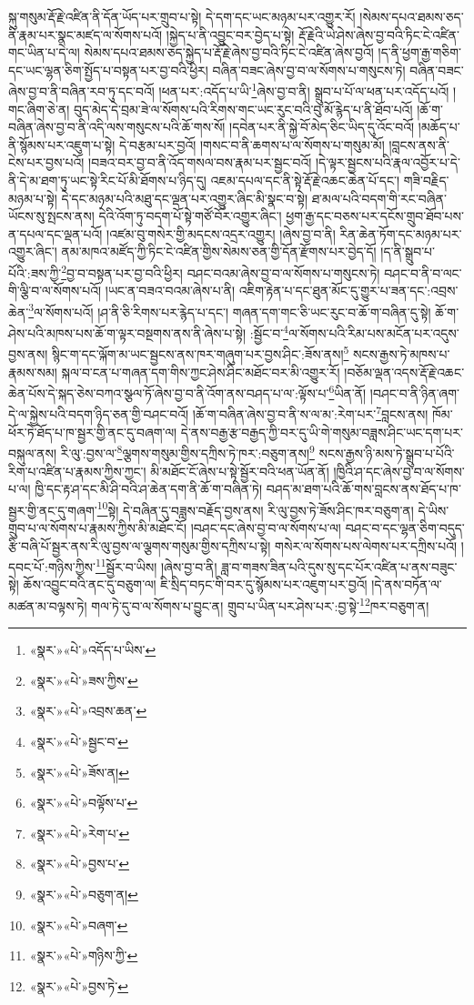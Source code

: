 སྐུ་གསུམ་རྡོ་རྗེ་འཛིན་ནི་དོན་ཡོད་པར་གྲུབ་པ་སྟེ། དེ་དག་དང་ཡང་མཉམ་པར་འགྱུར་རོ། །སེམས་དཔའ་ཐམས་ཅད་ནི་རྣམ་པར་སྣང་མཛད་ལ་སོགས་པའོ། །སྐྱེད་པ་ནི་འབྱུང་བར་བྱེད་པ་སྟེ། རྡོ་རྗེའི་ཡེ་ཤེས་ཞེས་བྱ་བའི་ཏིང་ངེ་འཛིན་གང་ཡིན་པ་དེ་ལ། སེམས་དཔའ་ཐམས་ཅད་སྐྱེད་པ་རྡོ་རྗེ་ཞེས་བྱ་བའི་ཏིང་ངེ་འཛིན་ཞེས་བྱའོ། །ད་ནི་ཕྱག་རྒྱ་གཅིག་དང་ཡང་ལྷན་ཅིག་སྤྱོད་པ་བསྟན་པར་བྱ་བའི་ཕྱིར། བཞིན་བཟང་ཞེས་བྱ་བ་ལ་སོགས་པ་གསུངས་ཏེ། བཞིན་བཟང་ཞེས་བྱ་བ་ནི་བཞིན་རབ་ཏུ་དང་བའོ། །ཕན་པར་:འདོད་པ་ཡི་\footnote{«སྣར་»«པེ་»འདོད་པ་ཡིས་}ཞེས་བྱ་བ་ནི། སྒྲུབ་པ་པོ་ལ་ཕན་པར་འདོད་པའོ། །གང་ཞིག་ཅེ་ན། བུད་མེད་དེ་བྲམ་ཟེ་ལ་སོགས་པའི་རིགས་གང་ཡང་རུང་བའི་བུ་མོ་རྙེད་པ་ནི་ཐོབ་པའོ། །ཆོ་ག་བཞིན་ཞེས་བྱ་བ་ནི་འདི་ལས་གསུངས་པའི་ཆོ་གས་སོ། །དབེན་པར་ནི་སྐྱེ་བོ་མེད་ཅིང་ཡིད་དུ་འོང་བའོ། །མཆོད་པ་ནི་སྙོམས་པར་འཇུག་པ་སྟེ། དེ་བརྩམ་པར་བྱའོ། །གསང་བ་ནི་ཆགས་པ་ལ་སོགས་པ་གསུམ་མོ། །བླངས་ནས་ནི་ངེས་པར་བྱས་པའོ། །བཟའ་བར་བྱ་བ་ནི་འོད་གསལ་བས་རྣམ་པར་སྦྱང་བའོ། །དེ་ལྟར་སྦྱངས་པའི་རྣལ་འབྱོར་པ་དེ་ནི་དེ་མ་ཐག་ཏུ་ཡང་སྟེ་རིང་པོ་མི་ཐོགས་པ་ཉིད་དུ། འཇམ་དཔལ་དང་ནི་སྟེ་རྡོ་རྗེ་འཆང་ཆེན་པོ་དང་། གཟི་བརྗིད་མཉམ་པ་སྟེ། དེ་དང་མཉམ་པའི་མཐུ་དང་ལྡན་པར་འགྱུར་ཞིང་མི་སྣང་བ་སྟེ། ཐ་མལ་པའི་བདག་གི་རང་བཞིན་ཡོངས་སུ་སྤངས་ནས། དེའི་འོག་ཏུ་བདག་པོ་སྟེ་གཙོ་བོར་འགྱུར་ཞིང་། ཕྱག་རྒྱ་དང་བཅས་པར་དངོས་གྲུབ་ཐོབ་པས་ན་དཔལ་དང་ལྡན་པའོ། །འཛམ་བུ་གསེར་གྱི་མདངས་འདྲར་འགྱུར། །ཞེས་བྱ་བ་ནི། རིན་ཆེན་ཏོག་དང་མཉམ་པར་འགྱུར་ཞིང་། ནམ་མཁའ་མཛོད་ཀྱི་ཏིང་ངེ་འཛིན་གྱིས་སེམས་ཅན་གྱི་དོན་རྫོགས་པར་བྱེད་དོ། །ད་ནི་སྒྲུབ་པ་པོའི་:ཟས་ཀྱི་\footnote{«སྣར་»«པེ་»ཟས་ཀྱིས་}བྱ་བ་བསྟན་པར་བྱ་བའི་ཕྱིར། བཤང་བའམ་ཞེས་བྱ་བ་ལ་སོགས་པ་གསུངས་ཏེ། བཤང་བ་ནི་བ་ལང་གི་ལྕི་བ་ལ་སོགས་པའོ། །ཡང་ན་བཟའ་བའམ་ཞེས་པ་ནི། འཇིག་རྟེན་པ་དང་ཐུན་མོང་དུ་གྱུར་པ་ཟན་དང་:འབྲས་ཆེན་\footnote{«སྣར་»«པེ་»འབྲས་ཆན་}ལ་སོགས་པའོ། །ཤ་ནི་ཅི་རིགས་པར་རྙེད་པ་དང་། གཞན་དག་གང་ཅི་ཡང་རུང་བ་ཆོ་ག་བཞིན་དུ་སྟེ། ཆོ་ག་ཤེས་པའི་མཁས་པས་ཆོ་ག་ལྟར་བསྔགས་ནས་ནི་ཞེས་པ་སྟེ། :སྦྱོང་བ་\footnote{«སྣར་»«པེ་»སྦྱང་བ་}ལ་སོགས་པའི་རིམ་པས་མངོན་པར་འདུས་བྱས་ནས། སྙིང་ག་དང་ལྐོག་མ་ཡང་སྦྱངས་ནས་ཁར་གཞུག་པར་བྱས་ཤིང་:ཟོས་ནས།\footnote{«སྣར་»«པེ་»ཟོས་ན།} སངས་རྒྱས་ཏེ་མཁས་པ་རྣམས་སམ། སྐལ་བ་ངན་པ་གཞན་དག་གིས་ཀྱང་ཤེས་ཤིང་མཐོང་བར་མི་འགྱུར་རོ། །བཅོམ་ལྡན་འདས་རྡོ་རྗེ་འཆང་ཆེན་པོས་དེ་སྐད་ཅེས་བཀའ་སྩལ་ཏོ་ཞེས་བྱ་བ་ནི་འོག་ནས་བཤད་པ་ལ་:ལྟོས་པ་\footnote{«སྣར་»«པེ་»བལྟོས་པ་}ཡིན་ནོ། །བཤང་བ་ནི་ཉིན་ཞག་དེ་ལ་སྐྱེས་པའི་བདག་ཉིད་ཅན་གྱི་བཤང་བའོ། །ཆོ་ག་བཞིན་ཞེས་བྱ་བ་ནི་ས་ལ་མ་:རེག་པར་\footnote{«སྣར་»«པེ་»རེག་པ་}བླངས་ནས། ཁོམ་ཕོར་ཏེ་ཐོད་པ་ཁ་སྦྱར་གྱི་ནང་དུ་བཞག་ལ། དེ་ནས་བརྒྱ་རྩ་བརྒྱད་ཀྱི་བར་དུ་ཡི་གེ་གསུམ་བཟླས་ཤིང་ཡང་དག་པར་བསྐུལ་ནས། རི་ལུ་:བྱས་ལ་\footnote{«སྣར་»«པེ་»བྱས་པ་}ལྕགས་གསུམ་གྱིས་དཀྲིས་ཏེ་ཁར་:བཅུག་ནས།\footnote{«སྣར་»«པེ་»བཅུག་ན།} སངས་རྒྱས་ཉི་མས་ཏེ་སྒྲུབ་པ་པོའི་རིག་པ་འཛིན་པ་རྣམས་ཀྱིས་ཀྱང་། མི་མཐོང་ངོ་ཞེས་པ་སྟེ་སྦྱོར་བའི་ཕན་ཡོན་ནོ། །ཁྱིའི་ཤ་དང་ཞེས་བྱ་བ་ལ་སོགས་པ་ལ། ཁྱི་དང་རྟ་ཤ་དང་མི་ཤི་བའི་ཤ་ཆེན་དག་ནི་ཆོ་ག་བཞིན་ཏེ། བཤད་མ་ཐག་པའི་ཆོ་གས་བླངས་ནས་ཐོད་པ་ཁ་སྦྱར་གྱི་ནང་དུ་གཞག་\footnote{«སྣར་»«པེ་»བཞག་}སྟེ། དེ་བཞིན་དུ་བཟླས་བརྗོད་བྱས་ནས། རི་ལུ་བྱས་ཏེ་ཟོས་ཤིང་ཁར་བཅུག་ན། དེ་ཡིས་གྲུབ་པ་ལ་སོགས་པ་རྣམས་ཀྱིས་མི་མཐོང་ངོ། །བཤང་དང་ཞེས་བྱ་བ་ལ་སོགས་པ་ལ། བཤང་བ་དང་ལྷན་ཅིག་བདུད་རྩི་བཞི་པོ་སྦྱར་ནས་རི་ལུ་བྱས་ལ་ལྕགས་གསུམ་གྱིས་དཀྲིས་པ་སྟེ། གསེར་ལ་སོགས་པས་ལེགས་པར་དཀྲིས་པའོ། །དབང་པོ་:གཉིས་ཀྱིས་\footnote{«སྣར་»«པེ་»གཉིས་ཀྱི་}སྦྱོར་བ་ཡིས། །ཞེས་བྱ་བ་ནི། ཟླ་བ་གཟས་ཟིན་པའི་དུས་སུ་དང་པོར་འཛིན་པ་ནས་བཟུང་སྟེ། ཆོས་འབྱུང་བའི་ནང་དུ་བཅུག་ལ། ཇི་སྲིད་བཏང་གི་བར་དུ་སྙོམས་པར་འཇུག་པར་བྱའོ། །དེ་ནས་བཏོན་ལ་མཚན་མ་བལྟས་ཏེ། གལ་ཏེ་དུ་བ་ལ་སོགས་པ་བྱུང་ན། གྲུབ་པ་ཡིན་པར་ཤེས་པར་:བྱ་སྟེ་\footnote{«སྣར་»«པེ་»བྱས་ཏེ་}ཁར་བཅུག་ན། 